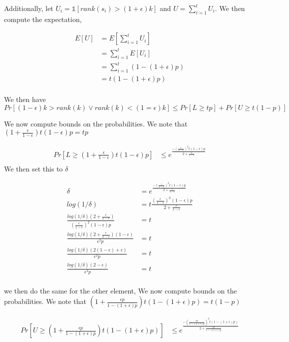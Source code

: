 \documentclass[a4paper]{article}
\newcommand{\ind}[1]{\mathds{1}[#1]}
\def \eps{\epsilon}
\begin{document}
Additionally, let 
$U_i = \ind{rank(s_i) > (1+\eps)k}$ and $U = \sum_{i=1}^{t} U_i$. We then compute the expectation,

\begin{align*}
	E[U] &= E[\sum_{i=1}^{t} U_i] \\
			&= \sum_{i=1}^{t} E[U_i]\\
			&= \sum_{i=1}^{t} (1-(1+\eps)p)\\
			&=  t(1-(1+\eps)p)\\
\end{align*}



We then have\\
$$Pr[(1-\eps)k > rank(k) \lor rank(k) < (1=\eps)k] \leq Pr[L \geq tp] +  Pr[U \geq t(1-p)] $$

We now compute bounds on the probabilities. We note that $(1 + \frac{\eps}{1-\eps})t(1-\eps)p = tp$

\begin{align*}
	Pr[L \geq (1 + \frac{\eps}{1-\eps})t(1-\eps)p] &\leq e^{ \frac{-	(\frac{\eps}{1-\eps})^2t(1-\eps)p}{2 + \frac{\eps}{1-\eps}}}\\
\end{align*}
We then set this to $\delta$

\begin{align*}
	\delta &= e^{ \frac{-	(\frac{\eps}{1-\eps})^2t(1-\eps)p}{2 + \frac{\eps}{1-\eps}}}\\
	log(1/\delta) &= t\frac{(\frac{\eps}{1-\eps})^2(1-\eps)p}{2 + \frac{\eps}{1-\eps}}\\
	 \frac{log(1/\delta)(2 + \frac{\eps}{1-\eps})}{(\frac{\eps}{1-\eps})^2(1-\eps)p}&= t\\
	 \frac{log(1/\delta)(2 + \frac{\eps}{1-\eps})(1-\eps)}{\eps^2p}&= t\\
	 \frac{log(1/\delta)(2(1-\eps) + \eps)  }{\eps^2p}&= t\\
	 \frac{log(1/\delta)(2-\eps)  }{\eps^2p}&= t\\
\end{align*}


we then do the same for the other element,
We now compute bounds on the probabilities. We note that $(1 + \frac{\eps p}{1-(1+\eps)p})t(1 - (1+\eps)p) = t(1-p)$

\begin{align*}
	Pr[U \geq (1 + \frac{\eps p}{1-(1+\eps)p})t(1 - (1+\eps)p)] &\leq e^{ \frac{-	(\frac{\eps p}{1-(1+\eps)p})^2t(1-(1+\eps)p)}{2 + \frac{\eps p}{1-(1+\eps)p}}}\\
\end{align*}
\end{document}
